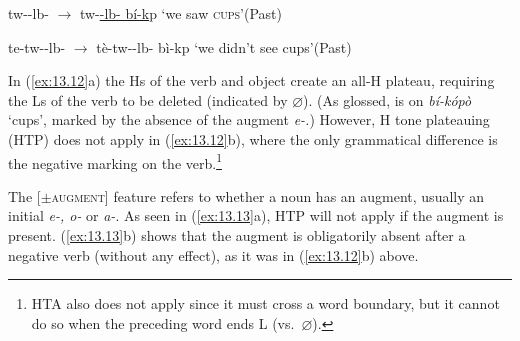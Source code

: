 \documentclass[output=paper]{langsci/langscibook}
\begin{document}
\ea\label{ex:13.12}
    \ea tw--lb-  ${\rightarrow}$
        tw-\underline{-lb-
        bí-k}p  ‘we saw \textsc{cups}’\hfill(Past)
        \vspace{.75\baselineskip}
    \ex te-tw--lb-  ${\rightarrow}$
        tè-tw--lb-  bì-kp
        ‘we didn’t see cups’\hfill(Past)
        \vspace{.75\baselineskip}
    \z
\z
In (\ref{ex:13.12}a) the Hs of the verb and object create an all-H plateau,
requiring the Ls of the verb to be deleted (indicated by $\varnothing$). (As
glossed, 
is on \emph{bí-kópò} ‘cups’, marked by the absence of the augment \emph{e-.})
However, H tone plateauing (\gls{HTP}) does not apply in
(\ref{ex:13.12}b), where the only grammatical difference is the negative
marking on the verb.\footnote{\gls{HTA} also does not apply since it must cross
a word boundary, but it cannot do so when the preceding word ends L (vs.\ $\varnothing$).}

The [$\pm$\textsc{augment}] feature refers to whether a noun has an augment,
usually an initial \emph{e-, o-} or \emph{a-}. As seen in
(\ref{ex:13.13}a), \gls{HTP} will not apply if the augment is present.
(\ref{ex:13.13}b) shows that the augment is obligatorily absent after a
negative verb (without any  effect), as it was in (\ref{ex:13.12}b)
above.
\end{document}
